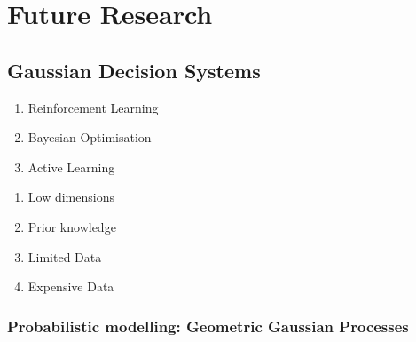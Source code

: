 \chapter{Future Research}

\section{Gaussian Decision Systems}

\begin{enumerate}
    \item Reinforcement Learning
    \item Bayesian Optimisation
    \item Active Learning
\end{enumerate}



\begin{enumerate}
    \item Low dimensions
    \item Prior knowledge
    \item Limited Data
    \item Expensive Data
\end{enumerate}


\subsection{Probabilistic modelling: Geometric Gaussian Processes}



